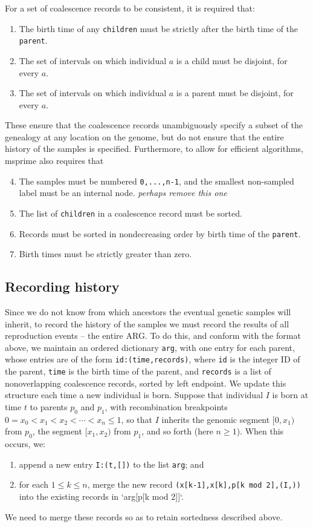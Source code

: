 \documentclass{bioinfo}
\newcommand{\plr}[1]{{\color{blue}\it #1}}
\begin{document}
\begin{methods}
For a set of coalescence records to be consistent,
it is required that:
\begin{enumerate}
    \item The birth time of any \texttt{children} must be strictly after the birth time of the \texttt{parent}.
    \item The set of intervals on which individual $a$ is a child must be disjoint, for every $a$.
    \item The set of intervals on which individual $a$ is a parent must be disjoint, for every $a$.
\end{enumerate}
These ensure that the coalescence records unambiguously specify a subset of the genealogy at any location on the genome,
but do not ensure that the entire history of the samples is specified.
Furthermore, to allow for efficient algorithms, msprime also requires that
\begin{enumerate} \setcounter{enumi}{3}
    \item The samples must be numbered \texttt{0,...,n-1}, and the smallest non-sampled label must be an internal node.
        \plr{perhaps remove this one}
    \item The list of \texttt{children} in a coalescence record must be sorted.
    \item Records must be sorted in nondecreasing order by birth time of the \texttt{parent}.
    \item Birth times must be strictly greater than zero.
\end{enumerate}

\subsection{Recording history}

Since we do not know from which ancestors
the eventual genetic samples will inherit,
to record the history of the samples
we must record the results of all reproduction events -- 
the entire ARG.
To do this, and conform with the format above, we maintain
an ordered dictionary \texttt{arg},
with one entry for each parent,
whose entries are of the form
\texttt{id:(time,records)},
where \texttt{id} is the integer ID of the parent,
\texttt{time} is the birth time of the parent,
and \texttt{records} is a list of nonoverlapping coalescence records, sorted by left endpoint.
We update this structure each time a new individual is born.
Suppose that individual $I$ is born at time $t$ to parents $p_0$ and $p_1$,
with recombination breakpoints $0=x_0 < x_1 < x_2 < \cdots < x_n \le 1$,
so that $I$ inherits the genomic segment $[0,x_1)$ from $p_0$,
the segment $[x_1,x_2)$ from $p_1$, and so forth (here $n \ge 1$).
When this occurs, we:
\begin{enumerate}
    \item append a new entry \texttt{I:(t,[])} to the list \texttt{arg}; and
    \item for each $1 \le k \le n$, merge the new record \texttt{(x[k-1],x[k],p[k mod 2],(I,))}
        into the existing records in `arg[p[k mod 2]]`.
\end{enumerate}
We need to merge these records
so as to retain sortedness described above.

\end{methods}
\end{document}
